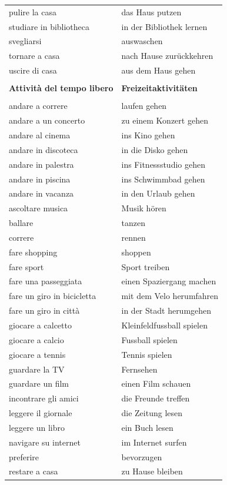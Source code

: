 \documentclass[10pt]{scrartcl}
\begin{document}
\begin{multicols*}{2}
\begin{supertabular}{p{4cm}p{4cm}}
pulire la casa & das Haus putzen\\
studiare in bibliotheca & in der Bibliothek lernen\\
svegliarsi & auswaschen\\
tornare a casa & nach Hause zurückkehren\\
uscire di casa & aus dem Haus gehen\\
\\
\textbf{Attività del tempo libero} & \textbf{Freizeitaktivitäten}\\
\\
andare a correre & laufen gehen\\
andare a un concerto & zu einem Konzert gehen\\
andare al cinema & ins Kino gehen\\
andare in discoteca & in die Disko gehen\\
andare in palestra & ins Fitnessstudio gehen\\
andare in piscina & ins Schwimmbad gehen\\
andare in vacanza & in den Urlaub gehen \\
ascoltare musica & Musik hören\\
ballare & tanzen\\
correre & rennen\\
fare shopping & shoppen\\
fare sport & Sport treiben\\
fare una passeggiata & einen Spaziergang machen\\
fare un giro in bicicletta & mit dem Velo herumfahren\\
fare un giro in città & in der Stadt herumgehen\\
giocare a calcetto & Kleinfeldfussball spielen\\
giocare a calcio & Fussball spielen\\
giocare a tennis & Tennis spielen\\
guardare la TV & Fernsehen\\
guardare un film & einen Film schauen\\
incontrare gli amici & die Freunde treffen\\
leggere il giornale & die Zeitung lesen\\
leggere un libro & ein Buch lesen\\
navigare su internet & im Internet surfen\\
preferire & bevorzugen\\
restare a casa & zu Hause bleiben\\

\end{supertabular}
\end{multicols*}
\end{document}
